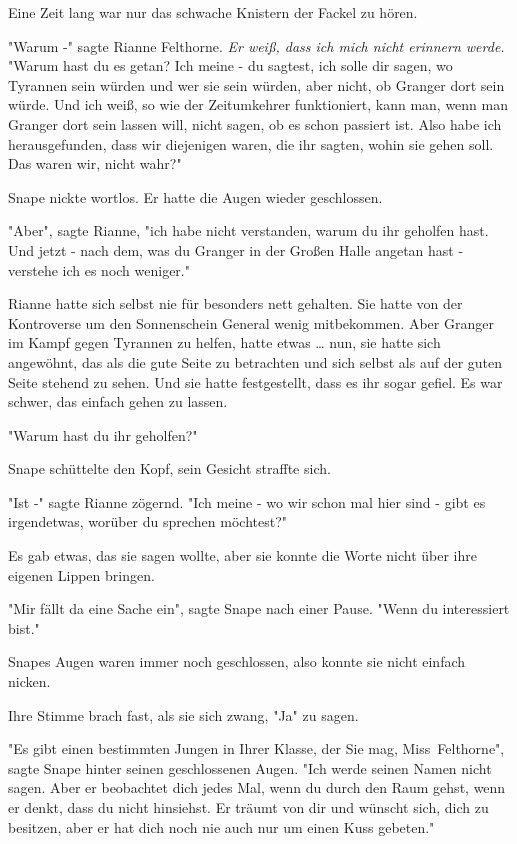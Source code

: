 {Eine Zeit lang war nur das schwache Knistern der Fackel zu hören.

"Warum -" sagte Rianne Felthorne. \emph{Er weiß, dass ich mich nicht erinnern werde.} "Warum hast du es getan? Ich meine - du sagtest, ich solle dir sagen, wo Tyrannen sein würden und wer sie sein würden, aber nicht, ob Granger dort sein würde. Und ich weiß, so wie der Zeitumkehrer funktioniert, kann man, wenn man Granger dort sein lassen will, nicht sagen, ob es schon passiert ist. Also habe ich herausgefunden, dass wir diejenigen waren, die ihr sagten, wohin sie gehen soll. Das waren wir, nicht wahr?"

Snape nickte wortlos. Er hatte die Augen wieder geschlossen.

"Aber", sagte Rianne, "ich habe nicht verstanden, warum du ihr geholfen hast. Und jetzt - nach dem, was du Granger in der Großen Halle angetan hast - verstehe ich es noch weniger."

Rianne hatte sich selbst nie für besonders nett gehalten. Sie hatte von der Kontroverse um den Sonnenschein General wenig mitbekommen. Aber Granger im Kampf gegen Tyrannen zu helfen, hatte etwas … nun, sie hatte sich angewöhnt, das als die gute Seite zu betrachten und sich selbst als auf der guten Seite stehend zu sehen. Und sie hatte festgestellt, dass es ihr sogar gefiel. Es war schwer, das einfach gehen zu lassen.

"Warum hast du ihr geholfen?"

Snape schüttelte den Kopf, sein Gesicht straffte sich.

"Ist -" sagte Rianne zögernd. "Ich meine - wo wir schon mal hier sind - gibt es irgendetwas, worüber du sprechen möchtest?"

Es gab etwas, das sie sagen wollte, aber sie konnte die Worte nicht über ihre eigenen Lippen bringen.

"Mir fällt da eine Sache ein", sagte Snape nach einer Pause. "Wenn du interessiert bist."

Snapes Augen waren immer noch geschlossen, also konnte sie nicht einfach nicken.

Ihre Stimme brach fast, als sie sich zwang, "Ja" zu sagen.

"Es gibt einen bestimmten Jungen in Ihrer Klasse, der Sie mag, Miss~Felthorne", sagte Snape hinter seinen geschlossenen Augen. "Ich werde seinen Namen nicht sagen. Aber er beobachtet dich jedes Mal, wenn du durch den Raum gehst, wenn er denkt, dass du nicht hinsiehst. Er träumt von dir und wünscht sich, dich zu besitzen, aber er hat dich noch nie auch nur um einen Kuss gebeten."

}

